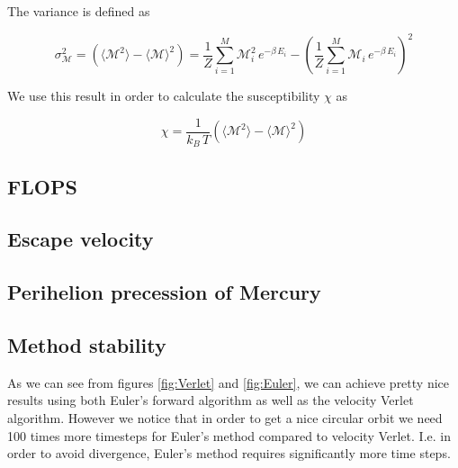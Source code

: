 \documentclass[a4paper, fontsize=11pt]{article}
\begin{document}
The variance is defined as 

\begin{equation}
\sigma^2_{\mathcal{M}} = \left( \langle \mathcal{M}^2 \rangle - \langle \mathcal{M} \rangle^2 \right) = \dfrac{1}{Z} \sum^M_{i=1} \mathcal{M}_{i}^2 \, e^{-\beta \, E_{i}} - \left( \dfrac{1}{Z} \sum^M_{i=1} \mathcal{M}_{i} \, e^{-\beta \, E_{i}} \right)^2
\end{equation}

We use this result in order to calculate the susceptibility $\chi$ as

\begin{equation}
\chi = \dfrac{1}{k_{B} \, T} \left( \langle \mathcal{M}^2 \rangle - \langle \mathcal{M} \rangle^2 \right)
\end{equation}


\cite{H-Jensen}

\subsection{FLOPS}




\subsection{Escape velocity}






\subsection{Perihelion precession of Mercury}




\subsection{Method stability} 




As we can see from figures \ref{fig:Verlet} and \ref{fig:Euler}, we can achieve pretty nice results using both Euler's forward algorithm as well as the velocity Verlet algorithm. However we notice that in order to get a nice circular orbit we need 100 times more timesteps for Euler's method compared to velocity Verlet. I.e. in order to avoid divergence, Euler's method requires significantly more time steps.


\end{document}
